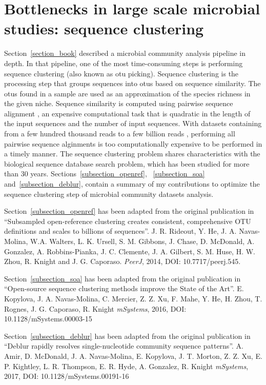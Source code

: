 \section{Bottlenecks in large scale microbial studies: sequence clustering}\label{section_bottlenecks}

Section~\ref{section_book} described a microbial community analysis pipeline in depth.
In that pipeline, one of the most time-consuming steps is performing
sequence clustering (also known as \gls{otu} picking). Sequence
clustering is the processing step that groups sequences into \gls{otu}s
based on sequence similarity. The \gls{otu}s found in a sample are used as an
approximation of the species richness in the given niche. Sequence similarity is
computed using pairwise sequence alignment \cite{Needleman1970, Smith1981}, an expensive
computational task that is quadratic in the length of the input sequences and
the number of input sequences. With
datasets containing from a few hundred thousand reads to a few billion
reads \cite{Goodwin2016}, performing all pairwise sequence alginments is too
computationally expensive to be performed in a timely manner. The sequence clustering
problem shares characteristics with the biological sequence database search problem,
which has been studied for more than 30 years. Sections~\ref{subsection_openref},
~\ref{subsection_soa} and~\ref{subsection_deblur}, contain a summary of my
contributions to optimize the sequence clustering step of microbial community
datasets analysis.

Section~\ref{subsection_openref} has been adapted from the original publication in
``Subsampled open-reference clustering creates consistent, comprehensive OTU
definitions and scales to billions of sequences''. J. R. Rideout, Y. He,
J. A. Navas-Molina, W.A. Walters, L. K. Ursell, S. M. Gibbons, J. Chase,
D. McDonald, A. Gonzalez, A. Robbins-Pianka, J. C. Clemente, J. A. Gilbert,
S. M. Huse, H. W. Zhou, R. Knight and J. G. Caporaso. \emph{PeerJ}, 2014, DOI: 10.7717/peerj.545.

Section~\ref{subsection_soa} has been adapted from the original publication in
``Open-source sequence clustering methods improve the State of the Art''.
E. Kopylova, J. A. Navas-Molina, C. Mercier, Z. Z. Xu, F. Mahe, Y. He, H. Zhou,
T. Rognes, J. G. Caporaso, R. Knight \emph{mSystems}, 2016, DOI: 10.1128/mSystems.00003-15

Section~\ref{subsection_deblur} has been adapted from the original publication in
``Deblur rapidly resolves single-nucleotide community sequence patterns''.
A. Amir, D. McDonald, J. A. Navas-Molina, E. Kopylova, J. T. Morton, Z. Z. Xu,
E. P. Kightley, L. R. Thompson, E. R. Hyde, A. Gonzalez, R. Knight \emph{mSystems},
2017, DOI: 10.1128/mSystems.00191-16

